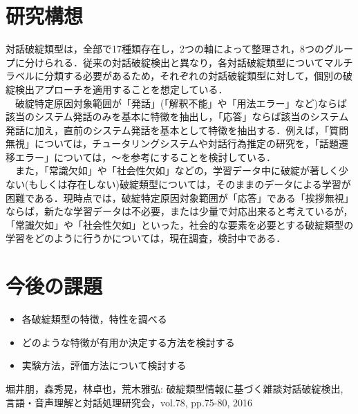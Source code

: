 \documentclass[upLaTex, 10pt,dvipdfmx,a4paper,twocolumn]{jsarticle}
\begin{document}
\section{研究構想}
    対話破綻類型は，全部で17種類存在し，2つの軸によって整理され，8つのグループに分けられる．従来の対話破綻検出と異なり，各対話破綻類型についてマルチラベルに分類する必要があるため，それぞれの対話破綻類型に対して，個別の破綻検出アプローチを適用することを想定している．\\
    　破綻特定原因対象範囲が「発話」(「解釈不能」や「用法エラー」など)ならば該当のシステム発話のみを基本に特徴を抽出し，「応答」ならば該当のシステム発話に加え，直前のシステム発話を基本として特徴を抽出する．例えば，「質問無視」については，チュータリングシステムや対話行為推定の研究を，「話題遷移エラー」については，～を参考にすることを検討している．\\  
    　また，「常識欠如」や「社会性欠如」などの，学習データ中に破綻が著しく少ない(もしくは存在しない)破綻類型については，そのままのデータによる学習が困難である．現時点では，破綻特定原因対象範囲が「応答」である「挨拶無視」ならば，新たな学習データは不必要，または少量で対応出来ると考えているが，「常識欠如」や「社会性欠如」といった，社会的な要素を必要とする破綻類型の学習をどのように行うかについては，現在調査，検討中である．

\section{今後の課題}
 \begin{itemize}
     \item 各破綻類型の特徴，特性を調べる
     \item どのような特徴が有用か決定する方法を検討する
     \item 実験方法，評価方法について検討する
 \end{itemize} 

 
 
\begin{thebibliography}{99}
     堀井朋，森秀晃，林卓也，荒木雅弘: 破綻類型情報に基づく雑談対話破綻検出, 言語・音声理解と対話処理研究会，vol.78, pp.75-80, 2016
    \end{thebibliography}
\end{document}
